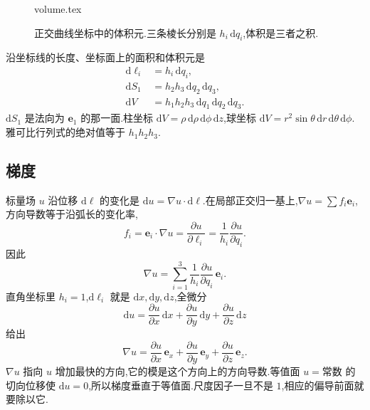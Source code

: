 \begin{figure}[htb]
  \centering
  {volume.tex}
  \caption{正交曲线坐标中的体积元.三条棱长分别是 $h_i\,\mathrm{d}q_i$,体积是三者之积.}
  \label{fig:volume-element}
\end{figure}

沿坐标线的长度、坐标面上的面积和体积元是
\begin{align}
  \mathrm{d}\ell_i &= h_i\,\mathrm{d}q_i, \\
  \mathrm{d}S_1 &= h_2 h_3\,\mathrm{d}q_2\,\mathrm{d}q_3, \\
  \mathrm{d}V &= h_1 h_2 h_3\,\mathrm{d}q_1\,\mathrm{d}q_2\,\mathrm{d}q_3.
  \label{eq:volume-element}
\end{align}
$\mathrm{d}S_1$ 是法向为 $\mathbf{e}_1$ 的那一面.柱坐标 $\mathrm{d}V=\rho\,\mathrm{d}\rho\,\mathrm{d}\phi\,\mathrm{d}z$,球坐标 $\mathrm{d}V=r^2\sin\theta\,\mathrm{d}r\,\mathrm{d}\theta\,\mathrm{d}\phi$.雅可比行列式的绝对值等于 $h_1 h_2 h_3$.

\subsection{梯度}

标量场 $u$ 沿位移 $\mathrm{d}\boldsymbol{\ell}$ 的变化是 $\mathrm{d}u=\nabla u\cdot\mathrm{d}\boldsymbol{\ell}$.在局部正交归一基上,$\nabla u=\sum f_i\mathbf{e}_i$,方向导数等于沿弧长的变化率,
\begin{equation}
  f_i=\mathbf{e}_i\cdot\nabla u
  =\frac{\partial u}{\partial\ell_i}
  =\frac{1}{h_i}\frac{\partial u}{\partial q_i}.
\end{equation}
因此
\begin{equation}
  \nabla u
  =\sum_{i=1}^{3}\frac{1}{h_i}\frac{\partial u}{\partial q_i}\,\mathbf{e}_i.
  \label{eq:grad-orthogonal}
\end{equation}
直角坐标里 $h_i=1$,$\mathrm{d}\ell_i$ 就是 $\mathrm{d}x,\mathrm{d}y,\mathrm{d}z$,全微分
\begin{equation}
  \mathrm{d}u
  =\frac{\partial u}{\partial x}\,\mathrm{d}x
  +\frac{\partial u}{\partial y}\,\mathrm{d}y
  +\frac{\partial u}{\partial z}\,\mathrm{d}z
\end{equation}
给出
\begin{equation}
  \nabla u
  =\frac{\partial u}{\partial x}\,\mathbf{e}_x
  +\frac{\partial u}{\partial y}\,\mathbf{e}_y
  +\frac{\partial u}{\partial z}\,\mathbf{e}_z.
\end{equation}
$\nabla u$ 指向 $u$ 增加最快的方向,它的模是这个方向上的方向导数.等值面 $u=\textrm{常数}$ 的切向位移使 $\mathrm{d}u=0$,所以梯度垂直于等值面.尺度因子一旦不是 $1$,相应的偏导前面就要除以它.

